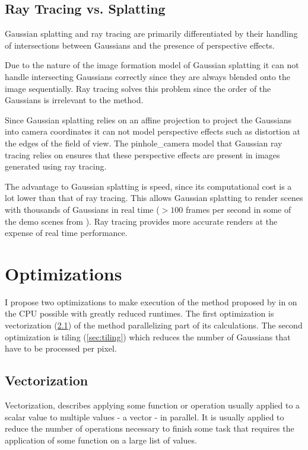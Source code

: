 \documentclass[a4paper, 11pt]{memoir}
\begin{document}
    \section{Ray Tracing vs. Splatting}
    \label{sec:ray_v_splat}
    Gaussian splatting and ray tracing are primarily differentiated by their handling of intersections between Gaussians
    and the presence of perspective effects.

    Due to the nature of the image formation model of Gaussian splatting it can not handle intersecting Gaussians correctly
    since they are always blended onto the image sequentially. Ray tracing solves this problem since the order of the
    Gaussians is irrelevant to the method.

    Since Gaussian splatting relies on an affine projection to project the Gaussians into camera coordinates it can not
    model perspective effects such as distortion at the edges of the field of view. The \gls{pinhole_camera} model that
    Gaussian ray tracing relies on ensures that these perspective effects are present in images generated using ray
    tracing.

    The advantage to Gaussian splatting is speed, since its computational cost is a lot lower than that of ray tracing.
    This allows Gaussian splatting to render scenes with thousands of Gaussians in real time ($>100$ frames per second
    in some of the demo scenes from \cite{kerbl3Dgaussians}). Ray tracing provides more accurate renders at the expense
    of real time performance.

    \chapter{Optimizations}
    \label{ch:optimizations}
    I propose two optimizations to make execution of the method proposed by \citeauthor{Rhodin:2015}
    in \cite{Rhodin:2015} on the CPU possible with greatly reduced runtimes.
    The first optimization is vectorization (\ref{sec:vectorization}) of the method
    parallelizing part of its calculations.
    The second optimization is tiling (\ref{sec:tiling}) which reduces the number of Gaussians
    that have to be processed per pixel.

    \section{Vectorization}
    \label{sec:vectorization}
    Vectorization, describes applying some function or operation usually applied to a scalar value
    to multiple values - a vector - in parallel.
    It is usually applied to reduce the number of operations necessary to finish some task that
    requires the application of some function on a large list of values.
\end{document}
